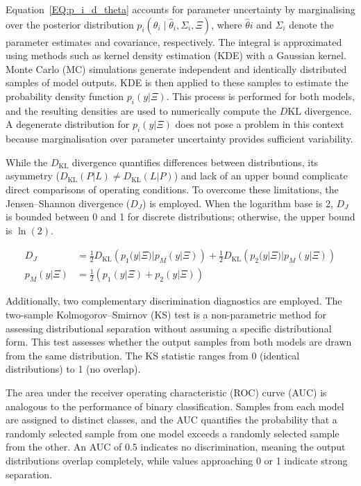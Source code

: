 \documentclass[../Article_Design_of_Experiment.tex]{subfiles}
\begin{document}
Equation~\ref{EQ:p_i_d_theta} accounts for parameter uncertainty by marginalising over the posterior distribution $p_i(\theta_i \mid \hat{\theta}_i, \Sigma_i, \Xi)$, where $\hat{\theta}i$ and $\Sigma_i$ denote the parameter estimates and covariance, respectively. The integral is approximated using methods such as kernel density estimation (KDE) with a Gaussian kernel. Monte Carlo (MC) simulations generate independent and identically distributed samples of model outputs. KDE is then applied to these samples to estimate the probability density function $p_i(y|\Xi)$. This process is performed for both models, and the resulting densities are used to numerically compute the $D{\mathrm{KL}}$ divergence. A degenerate distribution for $p_i(y|\Xi)$ does not pose a problem in this context because marginalisation over parameter uncertainty provides sufficient variability.

While the $D_{\mathrm{KL}}$ divergence quantifies differences between distributions, its asymmetry ($D_{\mathrm{KL}}(P|L) \neq D_{\mathrm{KL}}(L|P)$) and lack of an upper bound complicate direct comparisons of operating conditions. To overcome these limitations, the Jensen–Shannon divergence ($D_J$) is employed. When the logarithm base is 2, $D_J$ is bounded between 0 and 1 for discrete distributions; otherwise, the upper bound is $\ln(2)$.

{\footnotesize
	\begin{align}
		D_J &= \frac{1}{2} D_{\mathrm{KL}}\left( p_1(y|\Xi) | p_M(y|\Xi) \right) + \frac{1}{2} D_{\mathrm{KL}}\left( p_2(y|\Xi) | p_M(y|\Xi) \right) \nonumber \\
		p_M(y|\Xi) &= \frac{1}{2} \left( p_1(y|\Xi) + p_2(y|\Xi) \right)  
\end{align} }

Additionally, two complementary discrimination diagnostics are employed. The two-sample Kolmogorov–Smirnov (KS) test is a non-parametric method for assessing distributional separation without assuming a specific distributional form. This test assesses whether the output samples from both models are drawn from the same distribution. The KS statistic ranges from 0 (identical distributions) to 1 (no overlap).

The area under the receiver operating characteristic (ROC) curve (AUC) is analogous to the performance of binary classification. Samples from each model are assigned to distinct classes, and the AUC quantifies the probability that a randomly selected sample from one model exceeds a randomly selected sample from the other. An AUC of 0.5 indicates no discrimination, meaning the output distributions overlap completely, while values approaching 0 or 1 indicate strong separation.
\end{document}
